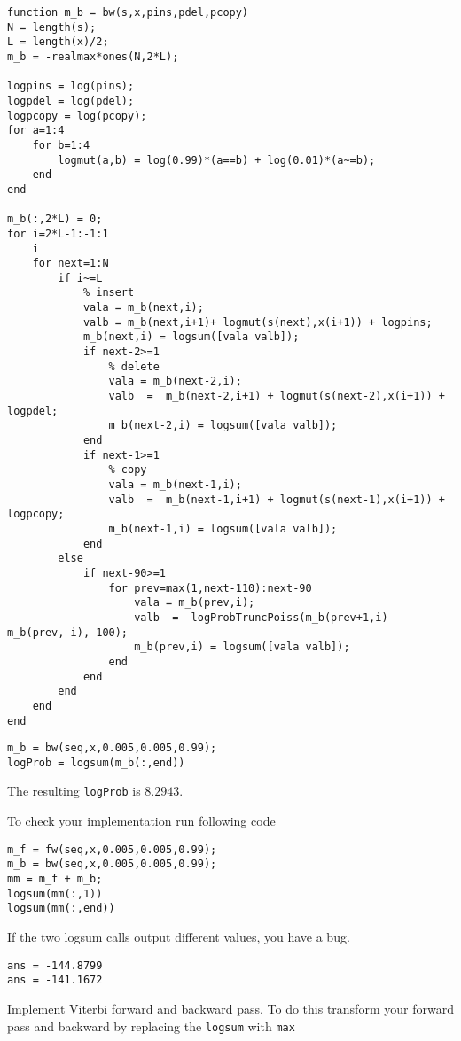 \documentclass{article}
\begin{document}
\begin{verbatim}
function m_b = bw(s,x,pins,pdel,pcopy)
N = length(s);
L = length(x)/2;
m_b = -realmax*ones(N,2*L);

logpins = log(pins);
logpdel = log(pdel);
logpcopy = log(pcopy);
for a=1:4
    for b=1:4
        logmut(a,b) = log(0.99)*(a==b) + log(0.01)*(a~=b);
    end
end

m_b(:,2*L) = 0;
for i=2*L-1:-1:1
    i
    for next=1:N
        if i~=L
            % insert
            vala = m_b(next,i);
            valb = m_b(next,i+1)+ logmut(s(next),x(i+1)) + logpins;
            m_b(next,i) = logsum([vala valb]);
            if next-2>=1
                % delete
                vala = m_b(next-2,i);
                valb  =  m_b(next-2,i+1) + logmut(s(next-2),x(i+1)) + logpdel;
                m_b(next-2,i) = logsum([vala valb]);
            end
            if next-1>=1
                % copy
                vala = m_b(next-1,i);
                valb  =  m_b(next-1,i+1) + logmut(s(next-1),x(i+1)) + logpcopy;
                m_b(next-1,i) = logsum([vala valb]);
            end
        else
            if next-90>=1
                for prev=max(1,next-110):next-90
                    vala = m_b(prev,i);
                    valb  =  logProbTruncPoiss(m_b(prev+1,i) - m_b(prev, i), 100);
                    m_b(prev,i) = logsum([vala valb]);
                end
            end
        end
    end
end
\end{verbatim}

\begin{verbatim}
m_b = bw(seq,x,0.005,0.005,0.99);
logProb = logsum(m_b(:,end))
\end{verbatim}
The resulting {\tt logProb} is $8.2943$.


To check your implementation run following code

\begin{verbatim}
m_f = fw(seq,x,0.005,0.005,0.99);
m_b = bw(seq,x,0.005,0.005,0.99);
mm = m_f + m_b;
logsum(mm(:,1))
logsum(mm(:,end))
\end{verbatim}

If the two logsum calls output different values, you have a bug.

\begin{verbatim}
ans = -144.8799
ans = -141.1672
\end{verbatim}

\newproblem{3pt} Implement Viterbi forward and backward pass. To do this transform your forward pass and backward by replacing the {\tt logsum} with {\tt max}
\end{document}

